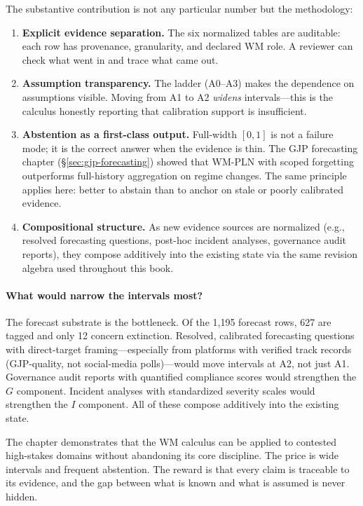 \documentclass[11pt,openany]{report}
\begin{document}
The substantive contribution is not any particular number but
the methodology:
\begin{enumerate}
\item \textbf{Explicit evidence separation.}  The six
  normalized tables are auditable: each row has provenance,
  granularity, and declared WM role.  A reviewer can check
  what went in and trace what came out.
\item \textbf{Assumption transparency.}  The ladder (A0--A3)
  makes the dependence on assumptions visible.  Moving from A1
  to A2 \emph{widens} intervals---this is the calculus honestly
  reporting that calibration support is insufficient.
\item \textbf{Abstention as a first-class output.}  Full-width
  $[0,1]$ is not a failure mode; it is the correct answer when
  the evidence is thin.  The GJP forecasting chapter
  (\S\ref{sec:gjp-forecasting}) showed that WM-PLN with scoped
  forgetting outperforms full-history aggregation on regime
  changes.  The same principle applies here: better to abstain
  than to anchor on stale or poorly calibrated evidence.
\item \textbf{Compositional structure.}  As new evidence
  sources are normalized (e.g., resolved forecasting questions,
  post-hoc incident analyses, governance audit reports), they
  compose additively into the existing state via the same
  revision algebra used throughout this book.
\end{enumerate}

\paragraph{What would narrow the intervals most?}
The forecast substrate is the bottleneck.  Of the 1,195 forecast
rows, 627 are tagged  and only 12 concern
extinction.  Resolved, calibrated forecasting questions with
direct-target framing---especially from platforms with verified
track records (GJP-quality, not social-media polls)---would move
intervals at A2, not just A1.  Governance audit reports with
quantified compliance scores would strengthen the $G$ component.
Incident analyses with standardized severity scales would
strengthen the $I$ component.  All of these compose additively
into the existing state.

\medskip\noindent
The chapter demonstrates that the WM calculus can be applied to
contested high-stakes domains without abandoning its core
discipline.  The price is wide intervals and frequent
abstention.  The reward is that every claim is traceable to
its evidence, and the gap between what is known and what is
assumed is never hidden.
\end{document}

